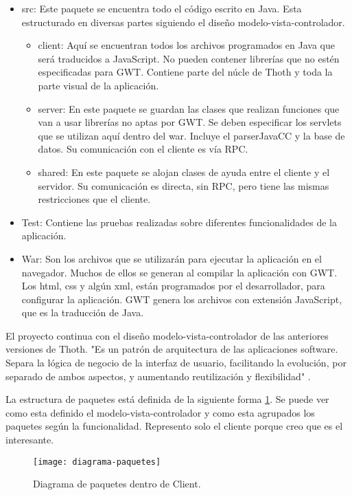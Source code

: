 \begin{itemize}
\item src:
Este paquete se encuentra todo el código escrito en Java. Esta estructurado en diversas partes siguiendo el diseño modelo-vista-controlador.
	\begin{itemize}
	\item client: Aquí se encuentran todos los archivos programados en Java que será traducidos a JavaScript. No pueden contener librerías que no estén especificadas para GWT. Contiene parte del núcle de Thoth y toda la parte visual de la aplicación.
	\item server: En este paquete se guardan las clases que realizan funciones que van a usar librerías no aptas por GWT. Se deben especificar los servlets que se utilizan aquí dentro del war. Incluye el parserJavaCC y la base de datos. Su comunicación con el cliente es vía RPC.
	\item shared: En este paquete se alojan clases de ayuda entre el cliente y el servidor. Su comunicación es directa, sin RPC, pero tiene las mismas restricciones que el cliente.
	\end{itemize}
\item Test: Contiene las pruebas realizadas sobre diferentes funcionalidades de la aplicación.

\item War:
	Son los archivos que se utilizarán para ejecutar la aplicación en el navegador. Muchos de ellos se generan al compilar la aplicación con GWT. Los html, css y algún xml, están programados por el desarrollador, para configurar la aplicación. GWT genera los archivos con extensión JavaScript, que es la traducción de Java.
\end{itemize}


El proyecto continua con el diseño modelo-vista-controlador de las anteriores versiones de Thoth. 
"Es un patrón de arquitectura de las aplicaciones software. Separa la lógica de negocio de la interfaz de usuario, facilitando la evolución, por separado de ambos aspectos, y aumentando reutilización y flexibilidad" \cite{mvc}.

La estructura de paquetes está definida de la siguiente forma \ref{fig:4.8}. Se puede ver como esta definido el modelo-vista-controlador y como esta agrupados los paquetes según la funcionalidad. Represento solo el cliente porque creo que es el interesante.

\begin{figure}[h]
\centering
\texttt{[image: diagrama-paquetes]}
\caption{Diagrama de paquetes dentro de Client.}
\label{fig:4.8}
\end{figure}
